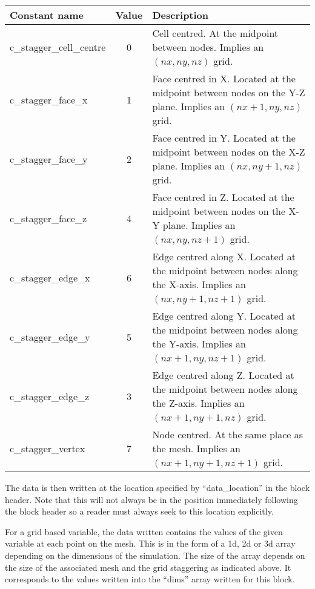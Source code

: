 \documentclass[12pt]{article}
\begin{document}
\begin{center}
\begin{tabularx}{0.9\textwidth}[!hbt]{lcX}
  Constant name & Value & Description
  \\\toprule

  c\_stagger\_cell\_centre & 0 & Cell centred. At the midpoint between nodes.
  Implies an $(nx,ny,nz)$ grid.
  \\\midrule

  c\_stagger\_face\_x & 1 & Face centred in X. Located at the midpoint between
  nodes on the Y-Z plane.
  Implies an $(nx+1,ny,nz)$ grid.
  \\\midrule

  c\_stagger\_face\_y & 2 & Face centred in Y. Located at the midpoint between
  nodes on the X-Z plane.
  Implies an $(nx,ny+1,nz)$ grid.
  \\\midrule

  c\_stagger\_face\_z & 4 & Face centred in Z. Located at the midpoint between
  nodes on the X-Y plane.
  Implies an $(nx,ny,nz+1)$ grid.
  \\\midrule

  c\_stagger\_edge\_x & 6 & Edge centred along X. Located at the midpoint
  between nodes along the X-axis.
  Implies an $(nx,ny+1,nz+1)$ grid.
  \\\midrule

  c\_stagger\_edge\_y & 5 & Edge centred along Y. Located at the midpoint
  between nodes along the Y-axis.
  Implies an $(nx+1,ny,nz+1)$ grid.
  \\\midrule

  c\_stagger\_edge\_z & 3 & Edge centred along Z. Located at the midpoint
  between nodes along the Z-axis.
  Implies an $(nx+1,ny+1,nz)$ grid.
  \\\midrule

  c\_stagger\_vertex & 7 & Node centred. At the same place as the mesh.
  Implies an $(nx+1,ny+1,nz+1)$ grid.
  \\\midrule
\end{tabularx}
\end{center}\vspace{10pt}

The data is then written at the location specified by ``data\_location'' in
the block header. Note that this will not always be in the position immediately
following the block header so a reader must always seek to this location
explicitly.

For a grid based variable, the data written contains the values of the given
variable at each point on the mesh. This is in the form of a 1d, 2d or 3d
array depending on the dimensions of the simulation. The size of the array
depends on the size of the associated mesh and the grid staggering as
indicated above. It corresponds to the values written into the ``dims''
array written for this block.
\end{document}
